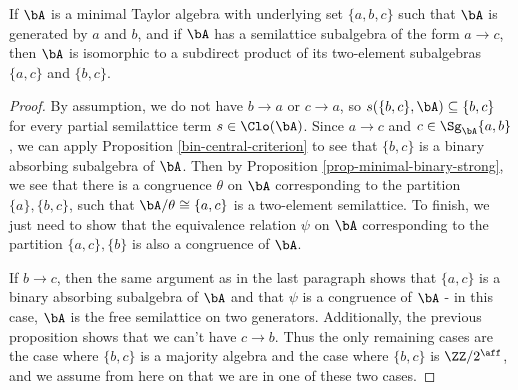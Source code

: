 \begin{prop} If $\bA$ is a minimal Taylor algebra with underlying set $\{a,b,c\}$ such that $\bA$ is generated by $a$ and $b$, and if $\bA$ has a semilattice subalgebra of the form $a \rightarrow c$, then $\bA$ is isomorphic to a subdirect product of its two-element subalgebras $\{a,c\}$ and $\{b,c\}$.
\end{prop}
\begin{proof} By assumption, we do not have $b \rightarrow a$ or $c \rightarrow a$, so $s(\{b,c\},\bA) \subseteq \{b,c\}$ for every partial semilattice term $s \in \Clo(\bA)$. Since $a \rightarrow c$ and $c \in \Sg_\bA\{a,b\}$, we can apply Proposition \ref{bin-central-criterion} to see that $\{b,c\}$ is a binary absorbing subalgebra of $\bA$. Then by Proposition \ref{prop-minimal-binary-strong}, we see that there is a congruence $\theta$ on $\bA$ corresponding to the partition $\{a\}, \{b,c\}$, such that $\bA/\theta \cong \{a,c\}$ is a two-element semilattice. To finish, we just need to show that the equivalence relation $\psi$ on $\bA$ corresponding to the partition $\{a,c\}, \{b\}$ is also a congruence of $\bA$.

If $b \rightarrow c$, then the same argument as in the last paragraph shows that $\{a,c\}$ is a binary absorbing subalgebra of $\bA$ and that $\psi$ is a congruence of $\bA$ - in this case, $\bA$ is the free semilattice on two generators. Additionally, the previous proposition shows that we can't have $c \rightarrow b$. Thus the only remaining cases are the case where $\{b,c\}$ is a majority algebra and the case where $\{b,c\}$ is $\ZZ/2^{\aff}$, and we assume from here on that we are in one of these two cases.


\end{proof}
